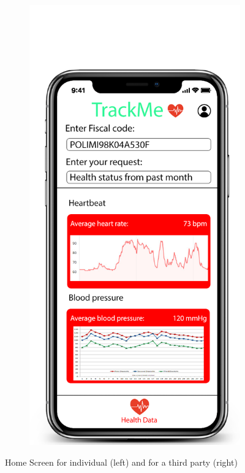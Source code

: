 \documentclass[12pt]{article}
\begin{document}
\begin{figure}[H]
\begin{subfigure}{.4\textwidth}
    \end{subfigure}%
    \begin{subfigure}{.4\textwidth}
        \includegraphics[scale=0.2]{HomeScreen4.png}
        \label{fig:HomeScreen2}
    \end{subfigure}
    \caption{Home Screen for individual (left) and for a third party (right)}
\end{figure}
\end{document}
